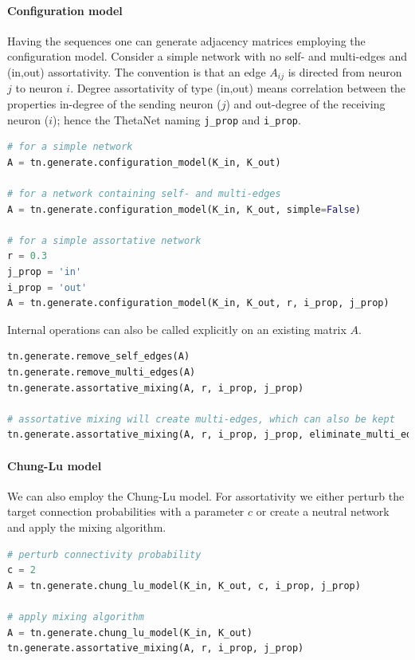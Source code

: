\documentclass[bibliography=totoc, twoside]{article}
\numberwithin{equation}{section}
\begin{document}
\paragraph*{Configuration model}
Having the sequences one can generate adjacency matrices employing the configuration model.
Consider a simple network with no self- and multi-edges and (in,out) assortativity.
The convention is that an edge $A_{ij}$ is directed from neuron $j$ to neuron $i$.
Degree assortativity of type (in,out) means correlation between the properties in-degree of the sending neuron ($j$) and out-degree of the receiving neuron ($i$);
hence the ThetaNet naming \texttt{j\_prop} and \texttt{i\_prop}.
\begin{lstlisting}[language=python]
# for a simple network
A = tn.generate.configuration_model(K_in, K_out)

# for a network containing self- and multi-edges
A = tn.generate.configuration_model(K_in, K_out, simple=False)

# for a simple assortative network
r = 0.3
j_prop = 'in'
i_prop = 'out'
A = tn.generate.configuration_model(K_in, K_out, r, i_prop, j_prop)
\end{lstlisting}
Internal operations can also be called explicitly on an existing matrix $A$.
\begin{lstlisting}[language=python]
tn.generate.remove_self_edges(A)
tn.generate.remove_multi_edges(A)
tn.generate.assortative_mixing(A, r, i_prop, j_prop)

# assortative mixing will create multi-edges, which can also be kept
tn.generate.assortative_mixing(A, r, i_prop, j_prop, eliminate_multi_edges=False)
\end{lstlisting}

\paragraph*{Chung-Lu model}
We can also employ the Chung-Lu model.
For assortativity we either perturb the target connection probabilities with a parameter $c$ or create a neutral network and apply the mixing algorithm.
\begin{lstlisting}[language=python]
# perturb connectivity probability
c = 2
A = tn.generate.chung_lu_model(K_in, K_out, c, i_prop, j_prop)

# apply mixing algorithm
A = tn.generate.chung_lu_model(K_in, K_out)
tn.generate.assortative_mixing(A, r, i_prop, j_prop)
\end{lstlisting}
\end{document}
